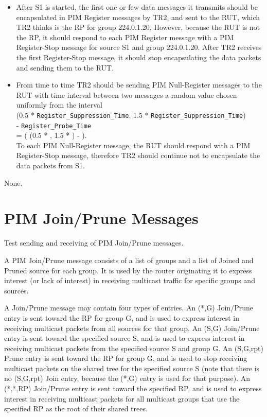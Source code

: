 \documentclass[11pt]{report}
\begin{document}
\begin{itemize}

  \item After S1 is started, the first one or few data messages it transmits
  should be encapsulated in PIM Register messages by TR2, and sent to the RUT,
  which TR2 thinks is the RP for group 224.0.1.20.
  However, because the RUT is not the RP, it should respond to each PIM
  Register message with a PIM Register-Stop message for source S1 and group
  224.0.1.20. After TR2 receives the first Register-Stop message, it should
  stop encapsulating the data packets and sending them to the RUT.

  \item From time to time TR2 should be sending PIM Null-Register
  messages to the RUT with time interval between two messages a random
  value chosen uniformly from the interval \\
  (0.5 * \verb=Register_Suppression_Time=,
  1.5 * \verb=Register_Suppression_Time=) \\
  - \verb=Register_Probe_Time= \\
  = ( (0.5 * {\PimsmRegisterSuppressionTime}, 1.5 *
  {\PimsmRegisterSuppressionTime}) - {\PimsmRegisterProbeTime} ). \\
  To each PIM Null-Register message, the RUT should respond with a
  PIM Register-Stop message, therefore TR2 should continue not to
  encapsulate the data packets from S1.

\end{itemize}

None.


\chapter{PIM Join/Prune Messages}

Test sending and receiving of PIM Join/Prune messages.

A PIM Join/Prune message consists of a list of groups and a list of
Joined and Pruned source for each group. It is used by the router
originating it to express interest (or lack of interest) in receiving
multicast traffic for specific groups and sources.

A Join/Prune message may contain four types of entries. An (*,G)
Join/Prune entry is sent toward the RP for group G, and is used to
express interest in receiving multicast packets from all sources for
that group. An (S,G) Join/Prune entry is sent toward the specified
source S, and is used to express interest in receiving multicast packets
from the specified source S and group G. An (S,G,rpt) Prune entry is
sent toward the RP for group G, and is used to stop receiving multicast
packets on the shared tree for the specified source S (note that there
is no (S,G,rpt) Join entry, because the (*,G) entry is used for that
purpose). An (*,*,RP) Join/Prune entry is sent toward the specified RP,
and is used to express interest in receiving multicast packets for all
multicast groups that use the specified RP as the root of their shared
trees.
\end{document}
